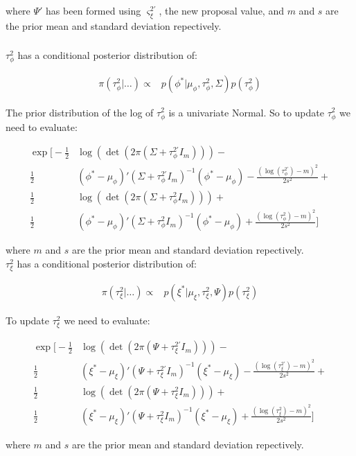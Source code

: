 \documentclass{article}
\begin{document}
where $\Psi'$ has been formed using $\varsigma^{2'}_\xi$, the new proposal value, and $m$ and $s$ are the prior mean and standard deviation repectively. \\

\subsubsection*{}

$\tau^2_\phi$ has a conditional posterior distribution of:

\begin{align*}
\pi(\tau^2_\phi | \dots ) \propto & p(\phi^{*} | \mu_\phi, \tau^2_\phi, \Sigma) p(\tau^2_\phi)
\end{align*}

The prior distribution of the log of $\tau^2_\phi$ is a univariate Normal. So to update $\tau^2_\phi$ we need to evaluate:

\begin{align}
\exp \Bigg[ - \frac{1}{2} & \log(\det(2 \pi (\Sigma + \tau^{2'}_\phi I_m))) - \nonumber \\
\frac{1}{2} & (\phi^{*} - \mu_\phi)' (\Sigma + \tau^{2'}_\phi I_m)^{-1} (\phi^{*} - \mu_\phi) - \frac{(\log(\tau^{2'}_\phi) - m)^2}{2 s^2} + \nonumber \\
\frac{1}{2} & \log(\det(2 \pi (\Sigma + \tau^2_\phi I_m))) + \nonumber \\
\frac{1}{2} & (\phi^{*} - \mu_\phi)' (\Sigma + \tau^2_\phi I_m)^{-1} (\phi^{*} - \mu_\phi) + \frac{(\log(\tau^2_\phi) - m)^2}{2 s^2} \Bigg] \label{eq:2t1}
\end{align}

where $m$ and $s$ are the prior mean and standard deviation repectively. \\

$\tau^2_\xi$ has a conditional posterior distribution of:

\begin{align*}
\pi(\tau^2_\xi | \dots ) \propto & p(\xi^{*} | \mu_\xi, \tau^2_\xi, \Psi) p(\tau^2_\xi)
\end{align*}

To update $\tau^2_\xi$ we need to evaluate:

\begin{align}
\exp \Bigg[ -\frac{1}{2} & \log(\det(2 \pi (\Psi + \tau^{2'}_\xi I_m))) - \nonumber \\
\frac{1}{2} & (\xi^{*} - \mu_\xi)' (\Psi + \tau^{2'}_\xi I_m)^{-1} (\xi^{*} - \mu_\xi) - \frac{(\log(\tau^{2'}_\xi) - m)^2}{2 s^2} + \nonumber \\
\frac{1}{2} & \log(\det(2 \pi (\Psi + \tau^{2}_\xi I_m))) +\nonumber \\
\frac{1}{2} & (\xi^{*} - \mu_\xi)' (\Psi + \tau^2_\xi I_m)^{-1} (\xi^{*} - \mu_\xi) + \frac{(\log(\tau^2_\xi) - m)^2}{2 s^2} \Bigg] \label{eq:2t2}
\end{align}

where $m$ and $s$ are the prior mean and standard deviation repectively.
\end{document}
